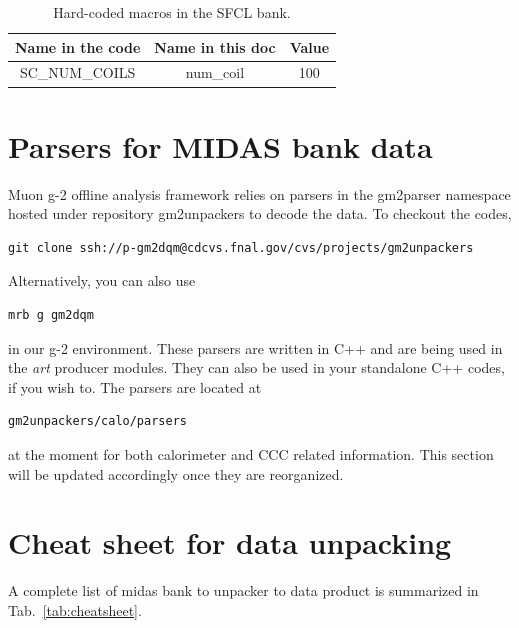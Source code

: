 \begin{table}[htbp]
\centering
\caption{Hard-coded macros in the SFCL bank.}
\begin{tabular}{|c|c|c|}
\hline
Name in the code    & Name in this doc & Value \\
\hline
SC\_NUM\_COILS &  num\_coil & 100 \\
\hline
\end{tabular} 
\label{tab:sfclmacro}
\end{table}

\newpage
\section{Parsers for MIDAS bank data}
Muon g-2 offline analysis framework relies on parsers in the gm2parser namespace hosted under repository gm2unpackers to decode the data. To checkout the codes, 

\begin{Verbatim}[frame=single]
git clone ssh://p-gm2dqm@cdcvs.fnal.gov/cvs/projects/gm2unpackers
\end{Verbatim}
%
Alternatively, you can also use 
\begin{Verbatim}[frame=single]
mrb g gm2dqm
\end{Verbatim}
in our g-2 environment.
%
These parsers are written in C++ and are being used in the \textit{art} producer modules. They can also be used in your standalone C++ codes, if you wish to. The parsers are located at
%
\begin{Verbatim}[frame=single]
gm2unpackers/calo/parsers
\end{Verbatim}
at the moment for both calorimeter and CCC related information. This section will be updated accordingly once they are reorganized.


\section{Cheat sheet for data unpacking}\label{sec:cheatsheet}

A complete list of midas bank to unpacker to data product is summarized in Tab.~\ref{tab:cheatsheet}. 

